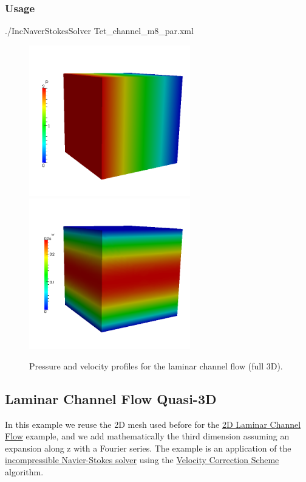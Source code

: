 \subsubsection{Usage}
./IncNaverStokesSolver Tet\_channel\_m8\_par.xml

\begin{figure}
\begin{center}
\includegraphics[width=7cm]{Figures/CF3DP8PR.png}
\includegraphics[width=7cm]{Figures/CF3DP8.png}
\caption{Pressure and velocity profiles for the laminar channel flow (full 3D).}
\end{center}
\end{figure}



\subsection{Laminar Channel Flow Quasi-3D}
In this example we reuse the 2D mesh used before for the \hyperref[LaminarChannelFlow2D]{2D Laminar Channel Flow} example, and we add mathematically the third dimension assuming an expansion along z with a Fourier series. The example is an application of the \hyperref[IncNSsolver]{incompressible Navier-Stokes solver} using the \hyperref[VCSscheme]{Velocity Correction Scheme} algorithm.


